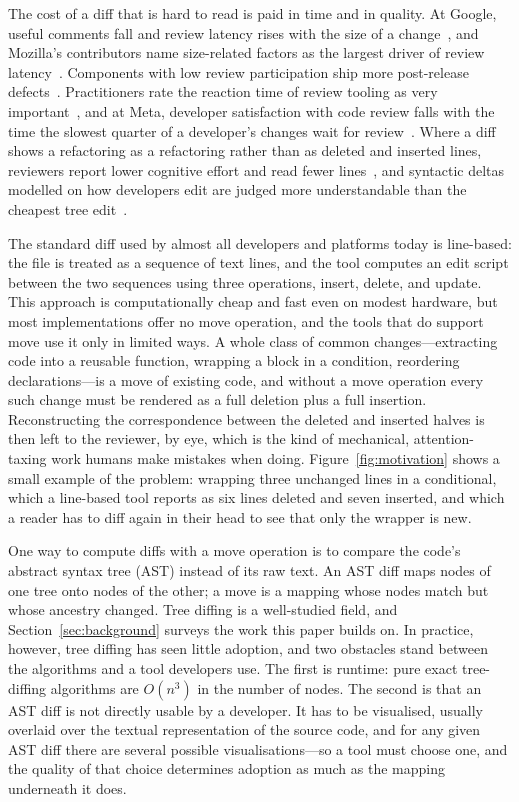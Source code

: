 \documentclass[sigconf]{acmart}
\begin{document}
The cost of a diff that is hard to read is paid in time and in quality. At Google, useful
comments fall and review latency rises with the size of a change~\cite{sadowski-2018}, and
Mozilla's contributors name size-related factors as the largest driver of review
latency~\cite{kononenko-2016}. Components with low review participation ship more post-release
defects~\cite{mcintosh-2016}. Practitioners rate the reaction time of review tooling as very
important~\cite{kudrjavets-2023}, and at Meta, developer satisfaction with code review
falls with the time the slowest quarter of a developer's changes wait for
review~\cite{meta-review-time-2022}. Where a diff shows a refactoring as a refactoring rather
than as deleted and inserted lines, reviewers report lower cognitive effort and read fewer
lines~\cite{ge-2017,brito-2021}, and syntactic deltas modelled on how developers edit are judged
more understandable than the cheapest tree edit~\cite{decker-2020}.

The standard diff used by almost all developers and platforms today is line-based: the file is
treated as a sequence of text lines, and the tool computes an edit script between the two
sequences using three operations, insert, delete, and update. This approach is computationally
cheap and fast even on modest hardware, but most implementations offer no move operation, and the
tools that do support move use it only in limited ways. A whole class of common
changes—extracting code into a reusable function, wrapping a block in a condition, reordering
declarations—is a move of existing code, and without a move operation every such
change must be rendered as a full deletion plus a full insertion. Reconstructing the
correspondence between the deleted and inserted halves is then left to the reviewer, by eye,
which is the kind of mechanical, attention-taxing work humans make mistakes when doing.
Figure~\ref{fig:motivation} shows a small example of the problem: wrapping three unchanged
lines in a conditional, which a line-based tool reports as six lines deleted and seven
inserted, and which a reader has to diff again in their head to see that only the wrapper is new.

One way to compute diffs with a move operation is to compare the code's abstract syntax
tree (AST) instead of its raw text. An AST diff maps nodes of one tree onto nodes of the other; a
move is a mapping whose nodes match but whose ancestry changed. Tree diffing is a well-studied
field, and Section~\ref{sec:background} surveys the work this paper builds on. In practice,
however, tree diffing has seen little adoption, and two obstacles stand between the algorithms and
a tool developers use. The first is runtime: pure exact tree-diffing algorithms are $O(n^3)$ in the number of nodes. The second is that an AST diff is not directly usable by a developer. It has
to be visualised, usually overlaid over the textual representation of the source code, and for any
given AST diff there are several possible visualisations---so a tool must choose one, and the quality of
that choice determines adoption as much as the mapping underneath it does.
\end{document}
